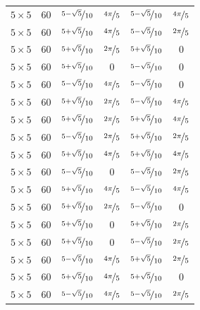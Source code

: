 \documentclass{article}
\begin{document}
\begin{longtable}{cccccc}
$5 \times 5$ & 60 & $\nicefrac{5-\sqrt{5}}{10}$ & $\nicefrac{4\pi}{5}$ & $\nicefrac{5-\sqrt{5}}{10}$ & $\nicefrac{4\pi}{5}$ \\
$5 \times 5$ & 60 & $\nicefrac{5+\sqrt{5}}{10}$ & $\nicefrac{4\pi}{5}$ & $\nicefrac{5-\sqrt{5}}{10}$ & $\nicefrac{2\pi}{5}$ \\
$5 \times 5$ & 60 & $\nicefrac{5+\sqrt{5}}{10}$ & $\nicefrac{2\pi}{5}$ & $\nicefrac{5+\sqrt{5}}{10}$ & 0 \\
$5 \times 5$ & 60 & $\nicefrac{5+\sqrt{5}}{10}$ & 0 & $\nicefrac{5-\sqrt{5}}{10}$ & 0 \\
$5 \times 5$ & 60 & $\nicefrac{5-\sqrt{5}}{10}$ & $\nicefrac{4\pi}{5}$ & $\nicefrac{5-\sqrt{5}}{10}$ & 0 \\
$5 \times 5$ & 60 & $\nicefrac{5+\sqrt{5}}{10}$ & $\nicefrac{2\pi}{5}$ & $\nicefrac{5-\sqrt{5}}{10}$ & $\nicefrac{4\pi}{5}$ \\
$5 \times 5$ & 60 & $\nicefrac{5+\sqrt{5}}{10}$ & $\nicefrac{2\pi}{5}$ & $\nicefrac{5+\sqrt{5}}{10}$ & $\nicefrac{4\pi}{5}$ \\
$5 \times 5$ & 60 & $\nicefrac{5-\sqrt{5}}{10}$ & $\nicefrac{2\pi}{5}$ & $\nicefrac{5+\sqrt{5}}{10}$ & $\nicefrac{2\pi}{5}$ \\
$5 \times 5$ & 60 & $\nicefrac{5+\sqrt{5}}{10}$ & $\nicefrac{4\pi}{5}$ & $\nicefrac{5+\sqrt{5}}{10}$ & $\nicefrac{4\pi}{5}$ \\
$5 \times 5$ & 60 & $\nicefrac{5-\sqrt{5}}{10}$ & 0 & $\nicefrac{5-\sqrt{5}}{10}$ & $\nicefrac{2\pi}{5}$ \\
$5 \times 5$ & 60 & $\nicefrac{5+\sqrt{5}}{10}$ & $\nicefrac{4\pi}{5}$ & $\nicefrac{5-\sqrt{5}}{10}$ & $\nicefrac{4\pi}{5}$ \\
$5 \times 5$ & 60 & $\nicefrac{5+\sqrt{5}}{10}$ & $\nicefrac{2\pi}{5}$ & $\nicefrac{5-\sqrt{5}}{10}$ & 0 \\
$5 \times 5$ & 60 & $\nicefrac{5+\sqrt{5}}{10}$ & 0 & $\nicefrac{5+\sqrt{5}}{10}$ & $\nicefrac{2\pi}{5}$ \\
$5 \times 5$ & 60 & $\nicefrac{5+\sqrt{5}}{10}$ & 0 & $\nicefrac{5-\sqrt{5}}{10}$ & $\nicefrac{2\pi}{5}$ \\
$5 \times 5$ & 60 & $\nicefrac{5-\sqrt{5}}{10}$ & $\nicefrac{4\pi}{5}$ & $\nicefrac{5+\sqrt{5}}{10}$ & $\nicefrac{2\pi}{5}$ \\
$5 \times 5$ & 60 & $\nicefrac{5+\sqrt{5}}{10}$ & $\nicefrac{4\pi}{5}$ & $\nicefrac{5+\sqrt{5}}{10}$ & 0 \\
$5 \times 5$ & 60 & $\nicefrac{5-\sqrt{5}}{10}$ & $\nicefrac{4\pi}{5}$ & $\nicefrac{5-\sqrt{5}}{10}$ & $\nicefrac{2\pi}{5}$ \\

\end{longtable}
\end{document}

